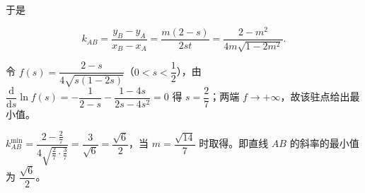 \begin{answer}
于是

\nopagebreak[4]
\[
k_{AB}=\dfrac{y_{B}-y_{A}}{x_{B}-x_{A}}=\dfrac{m(2-s)}{2st}=\dfrac{2-m^{2}}{4m\sqrt{1-2m^{2}}}.
\]

令 \(f(s)=\dfrac{2-s}{4\sqrt{s(1-2s)}}\)（\(0<s<\dfrac{1}{2}\)），由 \(\dfrac{\mathrm{d}}{\mathrm{d}s}\ln f(s)=-\dfrac{1}{2-s}-\dfrac{1-4s}{2s-4s^{2}}=0\) 得 \(s=\dfrac{2}{7}\)；两端 \(f\to+\infty\)，故该驻点给出最小值。

\(k_{AB}^{\min}=\dfrac{2-\frac{2}{7}}{4\sqrt{\frac{2}{7}\cdot\frac{3}{7}}}=\dfrac{3}{\sqrt{6}}=\dfrac{\sqrt{6}}{2}\)，当 \(m=\dfrac{\sqrt{14}}{7}\) 时取得。即直线 \(AB\) 的斜率的最小值为 \(\dfrac{\sqrt{6}}{2}\)。



\end{answer}